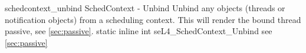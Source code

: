 %
%
%
%

\apidoc
{schedcontext_unbind}
{SchedContext - Unbind}
{Unbind any objects (threads or notification objects) from a scheduling context. 
This will render the bound thread passive, see \autoref{sec:passive}.}
{static inline int seL4\_SchedContext\_Unbind}
{
}
{\errorenumdesc}
{see \autoref{sec:passive}}
